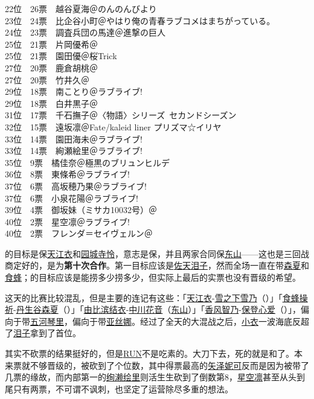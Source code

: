 { 22位　26票　越谷夏海＠のんのんびより\\
 23位　24票　比企谷小町＠やはり俺の青春ラブコメはまちがっている。\\
 24位　23票　調査兵団の馬達＠進撃の巨人\\
 25位　21票　片岡優希＠\Saki\\
 25位　21票　園田優＠桜Trick\\
 27位　20票　鹿倉胡桃＠\Saki\\
 27位　20票　竹井久＠\Saki\\
 29位　18票　南ことり＠ラブライブ!\\
 29位　18票　白井黒子＠\Railgan\\
 31位　17票　千石撫子＠〈物語〉シリーズ~セカンドシーズン\\
 32位　15票　遠坂凛＠Fate/kaleid liner プリズマ☆イリヤ\\
 33位　14票　園田海未＠ラブライブ!\\
 33位　14票　絢瀬絵里＠ラブライブ!\\
 35位　9票　橘佳奈＠極黒のブリュンヒルデ\\
 36位　8票　東條希＠ラブライブ!\\
 37位　6票　高坂穂乃果＠ラブライブ!\\
 37位　6票　小泉花陽＠ラブライブ!\\
 39位　4票　御坂妹（ミサカ10032号）＠\Railgan\\
 40位　2票　星空凛＠ラブライブ!\\
 40位　2票　フレンダ＝セイヴェルン＠\Railgan
}

的目标是保\uline{天江衣}和\uline{园城寺怜}，意志是保，并且两家合同保\uline{东山}——这也是三回战商定好的，是为\textbf{第十次合作}。第一目标应该是\uline{佐天泪子}，然而全场一直在带\uline{森夏}和\uline{食蜂}；的目标应该是能捞多少捞多少，但实际上最后的实票也没有晋级的希望。

这天的比赛比较混乱，但是主要的连记有这些：「\uline{天江衣}-\uline{雪之下雪乃}（）」「\uline{食蜂操祈}-\uline{丹生谷森夏}（）」「\uline{由比滨结衣}-\uline{中川花音}（\uline{东山}）」「\uline{香风智乃}-\uline{保登心爱}（）」，偏向于带\uline{五河琴里}，偏向于带\uline{亚丝娜}。经过了全天的大混战之后，\uline{小衣}一波海底反超了\uline{泪子}拿到了首位。

其实不砍票的结果挺好的，但是\uline{RUN}不是吃素的。大刀下去，死的就是和了。本来票就不够晋级的，被砍到了个位数，其中得票最高的\uline{矢泽妮可}反而是因为被带了几票的缘故，而内部第一的\uline{绚濑绘里}则活生生砍到了倒数第8，\uline{星空凛}甚至从头到尾只有两票，不可谓不讽刺，也坚定了运营除尽多重的想法。

